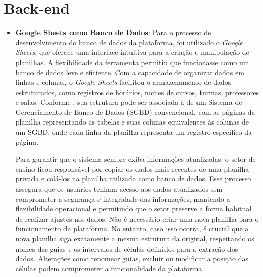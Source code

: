 \section{Back-end}

\begin{itemize}
    \item \textbf{Google Sheets como Banco de Dados}: Para o processo de desenvolvimento do banco de dados da plataforma, foi utilizado o \textit{Google Sheets}, que oferece uma interface intuitiva para a criação e manipulação de planilhas. A flexibilidade da ferramenta permitiu que funcionasse como um banco de dados leve e eficiente. Com a capacidade de organizar dados em linhas e colunas, o \textit{Google Sheets} facilitou o armazenamento de dados estruturados, como registros de horários, nomes de cursos, turmas, professores e salas. Conforme , sua estrutura pode ser associada à de um Sistema de Gerenciamento de Banco de Dados (SGBD) convencional, com as páginas da planilha representando as tabelas e suas colunas equivalentes às colunas de um SGBD, onde cada linha da planilha representa um registro específico da página.

    Para garantir que o sistema sempre exiba informações atualizadas, o setor de ensino ficou responsável por copiar os dados mais recentes de uma planilha privada e colá-los na planilha utilizada como banco de dados. Esse processo assegura que os usuários tenham acesso aos dados atualizados sem comprometer a segurança e integridade das informações, mantendo a flexibilidade operacional e permitindo que o setor preserve a forma habitual de realizar ajustes nos dados. Não é necessário criar uma nova planilha para o funcionamento da plataforma. No entanto, caso isso ocorra, é crucial que a nova planilha siga exatamente a mesma estrutura da original, respeitando os nomes das guias e os intervalos de células definidos para a extração dos dados. Alterações como renomear guias, excluir ou modificar a posição das células podem comprometer a funcionalidade da plataforma.
    

\end{itemize}
